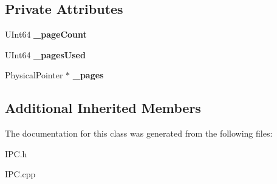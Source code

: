 \subsection*{Private Attributes}
\begin{DoxyCompactItemize}
\item 
\mbox{\label{class_kernel_buffer_memory_af6a876f25d917a8177d1ea0145b876d5}} 
U\+Int64 {\bfseries \+\_\+page\+Count}
\item 
\mbox{\label{class_kernel_buffer_memory_ab2f82ab9e7abd12bcc8a7c8e43d1347a}} 
U\+Int64 {\bfseries \+\_\+pages\+Used}
\item 
\mbox{\label{class_kernel_buffer_memory_ad2df04e9a03438ac4c2fc548882a0a1f}} 
Physical\+Pointer $\ast$ {\bfseries \+\_\+pages}
\end{DoxyCompactItemize}
\subsection*{Additional Inherited Members}


The documentation for this class was generated from the following files\+:\begin{DoxyCompactItemize}
\item 
I\+P\+C.\+h\item 
I\+P\+C.\+cpp\end{DoxyCompactItemize}
